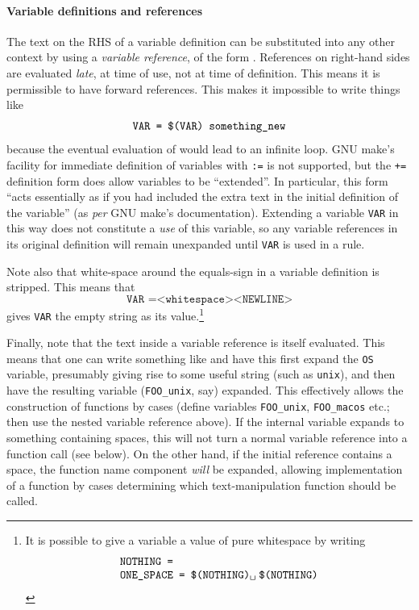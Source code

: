 \paragraph{Variable definitions and references} The text on the RHS of a variable
definition can be substituted into any other context by using a
\emph{variable reference}, of the form .
References on right-hand sides are evaluated \emph{late}, at time of use, not at time of definition.
This means it is permissible to have forward references.
This makes it impossible to write things like
\[
  \texttt{VAR = \texttt{\$(VAR)} something\_new}
\]
because the eventual evaluation of  would lead to an infinite loop.
GNU \textsf{make}'s facility for immediate definition of variables with \texttt{:=} is not supported, but the \texttt{+=} definition form does allow variables to be ``extended''.
In particular, this form ``acts essentially as if you had included the extra text in the initial definition of the variable'' (as \emph{per} GNU \textsf{make}'s documentation).
Extending a variable \texttt{VAR} in this way does not constitute a \emph{use} of this variable, so any variable references in its original definition will remain unexpanded until \texttt{VAR} is used in a rule.

Note also that white-space around the equals-sign in a variable
definition is stripped.  This means that
\[
\texttt{VAR =<whitespace><NEWLINE>}
\] gives \texttt{VAR} the empty string as its value.\footnote{It is
  possible to give a variable a value of pure whitespace by writing \[
\begin{array}{l}
\texttt{NOTHING =}\\
\texttt{ONE\_SPACE = \varref{NOTHING}\textvisiblespace\hspace{1mm}\varref{NOTHING}}\\
\end{array}\]}

Finally, note that the text inside a variable reference is itself
evaluated.  This means that one can write something like
 and have this first expand the \texttt{OS}
variable, presumably giving rise to some useful string (such as
\texttt{unix}), and then have the resulting variable
(\texttt{FOO\_unix}, say) expanded.  This effectively allows the
construction of functions by cases (define variables
\texttt{FOO\_unix}, \texttt{FOO\_macos} etc.; then use the nested
variable reference above).  If the internal variable expands to
something containing spaces, this will not turn a normal variable
reference into a function call (see below).  On the other hand,
if the initial reference contains a space, the function name component
\emph{will} be expanded, allowing implementation of a function by
cases determining which text-manipulation function should be called.

